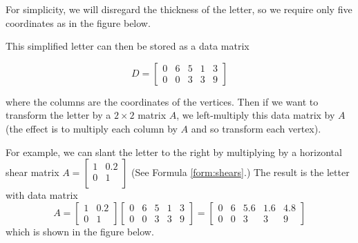 \documentclass{ximera}
\begin{document}
    For simplicity, we will disregard the thickness of the letter,
    so we require only five coordinates as in the figure below.
    
    \begin{center}
\end{center} 
    
This simplified letter can then be stored as a data matrix
    
$$D =\begin{bmatrix}
0 & 6 & 5 & 1 & 3\\
0 & 0 & 3 & 3 & 9
\end{bmatrix}$$
    
where the columns are the coordinates of the vertices. Then if we want to transform the letter by a $2 \times 2$ matrix $A$, we left-multiply this data matrix by $A$ (the effect is to multiply each column by $A$ and so transform each vertex).
    
For example, we can slant the letter to the right by multiplying by a horizontal shear matrix $A = \left[
\begin{array}{ll}
1 & 0.2\\
0 & 1\\
\end{array}
\right]$
    (See Formula \ref{form:shears}.) The result is the letter with data matrix
\begin{equation*}
A = \left[
\begin{array}{ll}
1 & 0.2\\
0 & 1
\end{array}
\right] \left[
\begin{array}{rrrrr}
0 & 6 & 5 & 1 & 3\\
0 & 0 & 3 & 3 & 9
\end{array}
\right] =
    \left[
\begin{array}{lllll}
0 & 6 & 5.6 & 1.6 & 4.8\\
0 & 0 & 3 & 3 & 9
\end{array}
\right]
\end{equation*}
which is shown in the figure below.
    
\end{document}
